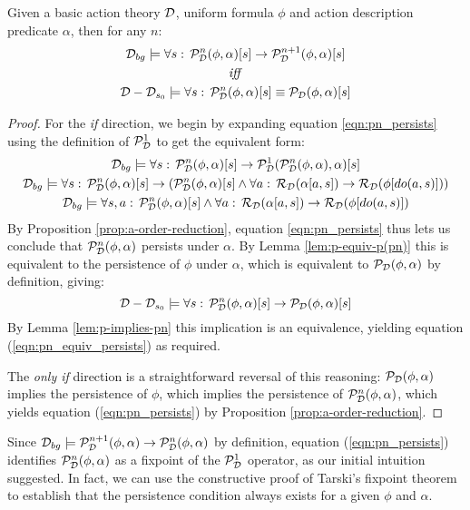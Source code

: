 \begin{thm}
Given a basic action theory $\mathcal{D}$, uniform formula $\phi$ and action
description predicate $\alpha$, then for any $n$:\label{thm:p(pn)-equiv-p}\begin{gather}
\mathcal{D}_{bg}\models\forall s:\,\mathcal{P}_{\mathcal{D}}^{n}(\phi,\alpha)[s]\rightarrow\mathcal{P}_{\mathcal{D}}^{n+1}(\phi,\alpha)[s]\label{eqn:pn_persists}\\
\mathit{iff}\nonumber \\
\mathcal{D}-\mathcal{D}_{s_{0}}\models\forall s:\,\mathcal{P}_{\mathcal{D}}^{n}(\phi,\alpha)[s]\equiv\mathcal{P}_{\mathcal{D}}(\phi,\alpha)[s]\label{eqn:pn_equiv_persists}\end{gather}

\end{thm}
\begin{proof}
For the \emph{if} direction, we begin by expanding equation \eqref{eqn:pn_persists}
using the definition of $\mathcal{P}_{\mathcal{D}}^{1}$ to get the equivalent form:\begin{gather*}
\mathcal{D}_{bg}\models\forall s:\,\mathcal{P}_{\mathcal{D}}^{n}(\phi,\alpha)[s]\rightarrow\mathcal{P}_{\mathcal{D}}^{1}(\mathcal{P}_{\mathcal{D}}^{n}(\phi,\alpha),\alpha)[s]\\
\mathcal{D}_{bg}\models\forall s:\,\mathcal{P}_{\mathcal{D}}^{n}(\phi,\alpha)[s]\rightarrow\left(\mathcal{P}_{\mathcal{D}}^{n}(\phi,\alpha)[s]\wedge\forall a:\,\mathcal{R}_{\mathcal{D}}(\alpha[a,s])\rightarrow\mathcal{R}_{\mathcal{D}}(\phi[do(a,s)])\right)\\
\mathcal{D}_{bg}\models\forall s,a:\,\mathcal{P}_{\mathcal{D}}^{n}(\phi,\alpha)[s]\wedge\forall a:\,\mathcal{R}_{\mathcal{D}}(\alpha[a,s])\rightarrow\mathcal{R}_{\mathcal{D}}(\phi[do(a,s)])\end{gather*}
 By Proposition \ref{prop:a-order-reduction}, equation \eqref{eqn:pn_persists}
thus lets us conclude that $\mathcal{P}_{\mathcal{D}}^{n}(\phi,\alpha)$ persists
under $\alpha$. By Lemma \ref{lem:p-equiv-p(pn)} this is equivalent
to the persistence of $\phi$ under $\alpha$, which is equivalent
to $\mathcal{P}_{\mathcal{D}}(\phi,\alpha)$ by definition, giving:\[
\mathcal{D}-\mathcal{D}_{s_{0}}\models\forall s:\,\mathcal{P}_{\mathcal{D}}^{n}(\phi,\alpha)[s]\rightarrow\mathcal{P}_{\mathcal{D}}(\phi,\alpha)[s]\]
 By Lemma \ref{lem:p-implies-pn} this implication is an equivalence,
yielding equation (\ref{eqn:pn_equiv_persists}) as required.

The \emph{only if} direction is a straightforward reversal of this
reasoning: $\mathcal{P}_{\mathcal{D}}(\phi,\alpha)$ implies the persistence of $\phi$,
which implies the persistence of $\mathcal{P}_{\mathcal{D}}^{n}(\phi,\alpha)$, which
yields equation (\ref{eqn:pn_persists}) by Proposition \ref{prop:a-order-reduction}. 
\end{proof}
Since $\mathcal{D}_{bg}\models\mathcal{P}_{\mathcal{D}}^{n+1}(\phi,\alpha)\rightarrow\mathcal{P}_{\mathcal{D}}^{n}(\phi,\alpha)$
by definition, equation (\ref{eqn:pn_persists}) identifies $\mathcal{P}_{\mathcal{D}}^{n}(\phi,\alpha)$
as a fixpoint of the $\mathcal{P}_{\mathcal{D}}^{1}$ operator, as our initial intuition
suggested. In fact, we can use the constructive proof of Tarski's
fixpoint theorem \citep{cousot79constructive_tarski} to establish
that the persistence condition always exists for a given $\phi$ and
$\alpha$.

